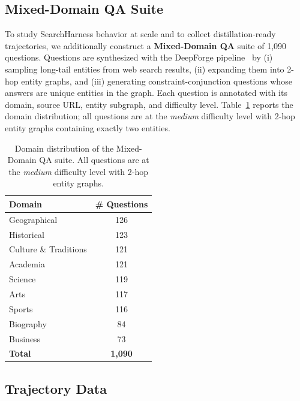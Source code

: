 \subsection{Mixed-Domain QA Suite}
\label{sec:data:mixqa}

To study SearchHarness behavior at scale and to collect distillation-ready trajectories, we additionally construct a \textbf{Mixed-Domain QA} suite of 1{,}090 questions.
Questions are synthesized with the DeepForge pipeline~\citep{deepforge} by (i) sampling long-tail entities from web search results, (ii) expanding them into 2-hop entity graphs, and (iii) generating constraint-conjunction questions whose answers are unique entities in the graph.
Each question is annotated with its domain, source URL, entity subgraph, and difficulty level.
Table~\ref{tab:data:mixqa} reports the domain distribution; all questions are at the \emph{medium} difficulty level with 2-hop entity graphs containing exactly two entities.

\begin{table}[t]
  \centering
  \small
  \begin{tabular}{lc}
    \toprule
    Domain & \# Questions \\
    \midrule
    Geographical        & 126 \\
    Historical          & 123 \\
    Culture \& Traditions & 121 \\
    Academia            & 121 \\
    Science             & 119 \\
    Arts                & 117 \\
    Sports              & 116 \\
    Biography           &  84 \\
    Business            &  73 \\
    \midrule
    \textbf{Total}      & \textbf{1{,}090} \\
    \bottomrule
  \end{tabular}
  \caption{Domain distribution of the Mixed-Domain QA suite. All questions are at the \emph{medium} difficulty level with 2-hop entity graphs.}
  \label{tab:data:mixqa}
\end{table}

\subsection{Trajectory Data}
\label{sec:data:traj}

